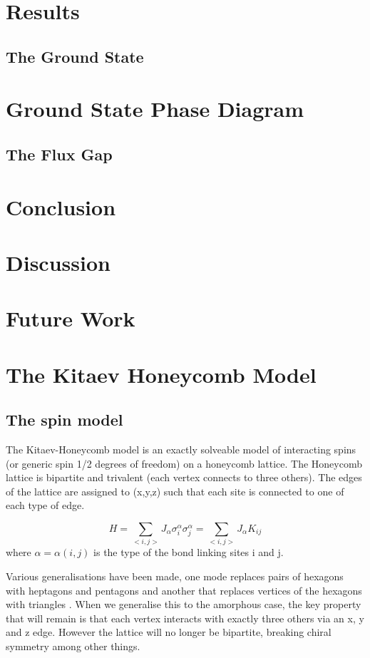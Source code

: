 \section{Results}
    \subsection{The Ground State}
	\section{Ground State Phase Diagram}
	\subsection{The Flux Gap}
	
		
\section{Conclusion}
\section{Discussion}
\section{Future Work}

\section{The Kitaev Honeycomb Model}

\subsection{The spin model}
The Kitaev-Honeycomb model is an exactly solveable model of interacting spins (or generic spin 1/2 degrees of freedom) on a honeycomb lattice. The Honeycomb lattice is bipartite and trivalent (each vertex connects to three others). The edges of the lattice are assigned to (x,y,z) such that each site is connected to one of each type of edge. 

\[H = \sum_{<i,j>} J_\alpha \sigma_i^{\alpha} \sigma_j^{\alpha} = \sum_{<i,j>} J_\alpha K_{ij}\]
where \(\alpha = \alpha(i,j)\) is the type of the bond linking sites i and j.

Various generalisations have been made, one mode replaces pairs of hexagons with heptagons and pentagons \cite{periNonAbelianChiralSpin2020} and another that replaces vertices of the hexagons with triangles \cite{yaoExactChiralSpin2007}. When we generalise this to the amorphous case, the key property that will remain is that each vertex interacts with exactly three others via an x, y and z edge. However the lattice will no longer be bipartite, breaking chiral symmetry among other things. 

